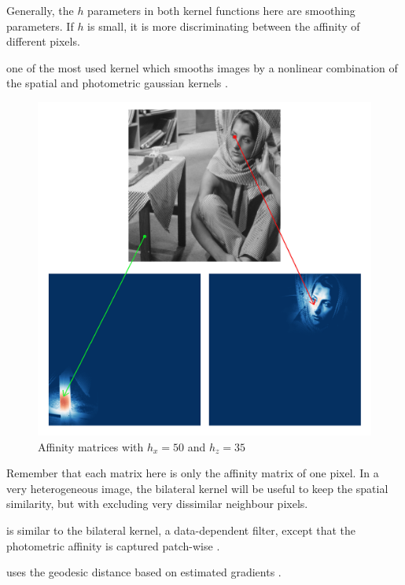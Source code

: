 \begin{description}[align=left]
  Generally, the \(h\) parameters in both kernel functions here are smoothing parameters.
  If \(h\) is small, it is more discriminating between the affinity of different pixels.

 \item [Bilateral Kernel] one of the most used kernel which smooths images by a nonlinear combination of the spatial and photometric gaussian kernels \cite{siam_slides_2016} \cite{glide_2014} \cite{bilateral_tomasi_1998}.

  \begin{figure}[H]
      \centering
      \includegraphics[width=\textwidth]{img/bilateralAffinityPhoto35Spatial50.png}
      \caption{Affinity matrices with \(h_x = 50\) and \(h_z = 35\)}
  \end{figure}

  Remember that each matrix here is only the affinity matrix of one pixel.
  In a very heterogeneous image, the bilateral kernel will be useful to keep the spatial similarity, but with excluding very dissimilar neighbour pixels.

 \item [Non-Local Means (NLM)] is similar to the bilateral kernel, a data-dependent filter, except that the photometric affinity is captured patch-wise \cite{glide_2014} \cite{kervrann_nlm_2006}.
 \item [Locally Adaptive Regression Kernel (LARK)] uses the geodesic distance based on estimated gradients \cite{milanfar_symmetrizing_2013} \cite{takeda_kernel_2007}.
\end{description}

